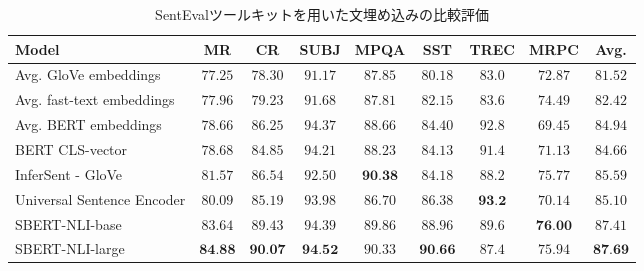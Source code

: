 \documentclass[12pt,a4j,dvipdfmx]{jreport}
\begin{document}
\begin{table}[H]
  \caption{
    SentEvalツールキットを用いた文埋め込みの比較評価
    \protect\footnotemark[9]
    }
  \vspace{3mm}
  \centering
  {\tabcolsep=0.1cm
    \begin{tabular}{l|cccccccc}
      \hline Model & MR & CR & SUBJ & MPQA & SST & TREC & MRPC & Avg. \\
      \hline Avg. GloVe embeddings & $77.25$ & $78.30$ & $91.17$ & $87.85$ & $80.18$ & $83.0$ & $72.87$ & $81.52$ \\
      Avg. fast-text embeddings & $77.96$ & $79.23$ & $91.68$ & $87.81$ & $82.15$ & $83.6$ & $74.49$ & $82.42$ \\
      Avg. BERT embeddings & $78.66$ & $86.25$ & $94.37$ & $88.66$ & $84.40$ & $92.8$ & $69.45$ & $84.94$ \\
      BERT CLS-vector & $78.68$ & $84.85$ & $94.21$ & $88.23$ & $84.13$ & $91.4$ & $71.13$ & $84.66$ \\
      InferSent - GloVe & $81.57$ & $86.54$ & $92.50$ & $\mathbf{9 0 . 3 8}$ & $84.18$ & $88.2$ & $75.77$ & $85.59$ \\
      Universal Sentence Encoder & $80.09$ & $85.19$ & $93.98$ & $86.70$ & $86.38$ & $\mathbf{9 3 . 2}$ & $70.14$ & $85.10$ \\
      \hline SBERT-NLI-base & $83.64$ & $89.43$ & $94.39$ & $89.86$ & $88.96$ & $89.6$ & $\mathbf{7 6 . 0 0}$ & $87.41$ \\
      SBERT-NLI-large & $\mathbf{8 4 . 8 8}$ & $\mathbf{9 0 . 0 7}$ & $\mathbf{9 4 . 5 2}$ & $90.33$ & $\mathbf{9 0 . 6 6}$ & $87.4$ & $75.94$ & $\mathbf{8 7 . 6 9}$ \\
      \hline
    \end{tabular}
  }  
  \label{sentence_bert_evaluation}
\end{table}

\end{document}
